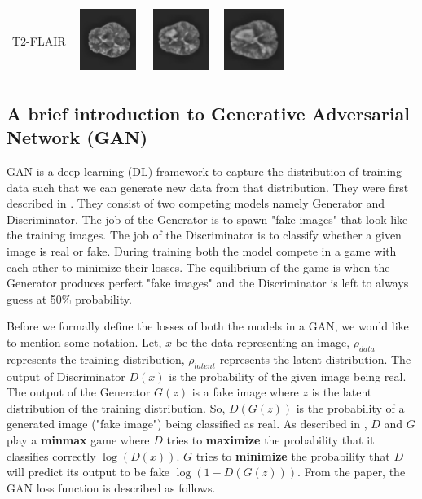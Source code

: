 \documentclass[10pt,journal,compsoc]{IEEEtran}
\begin{document}
\begin{table}[!t]
\begin{tabular}{ M{1cm} M{2cm}  M{2cm}  M{2cm} }
T2-FLAIR & \includegraphics[width=2cm, height=2cm]{t2_1.png} & \includegraphics[width=2cm, height=2cm]{t2_2.png} & \includegraphics[width=2cm, height=2cm]{t2_3.png} \\
\end{tabular}
\end{table}

\subsection{A brief introduction to Generative Adversarial Network (GAN)}

GAN is a deep learning (DL) framework to capture the distribution of training data such that we can generate new data from that distribution. They were first described 
in \cite{Goodfellow2014}. They consist of two competing models namely Generator and Discriminator. The job of the Generator is to spawn "fake images" that look like the
training images. The job of the Discriminator is to classify whether a given image is real or fake. During training both the model compete in a game with each other to minimize their losses. The equilibrium of the game is when the Generator produces perfect "fake images" and the Discriminator is left to always guess at 50\% probability.

Before we formally define the losses of both the models in a GAN, we would like to mention some notation. Let, $x$ be the data representing an image, $\rho_{data}$ represents the training distribution, $\rho_{latent}$ represents the latent distribution. The output of Discriminator $D(x)$ is the probability of the given image being
real. The output of the Generator $G(z)$ is a fake image where $z$ is the latent distribution of the training distribution. So, $D(G(z))$ is the probability of a
generated image ("fake image") being classified as real. As described in \cite{Goodfellow2014}, $D$ and $G$ play a \textbf{minmax} game where $D$ tries to \textbf{maximize}
the probability that it classifies correctly $\log(D(x))$. $G$ tries to \textbf{minimize} the probability that $D$ will predict its output to be fake $\log(1 - D(G(z)))$.
From the paper, the GAN loss function is described as follows.
\end{document}
